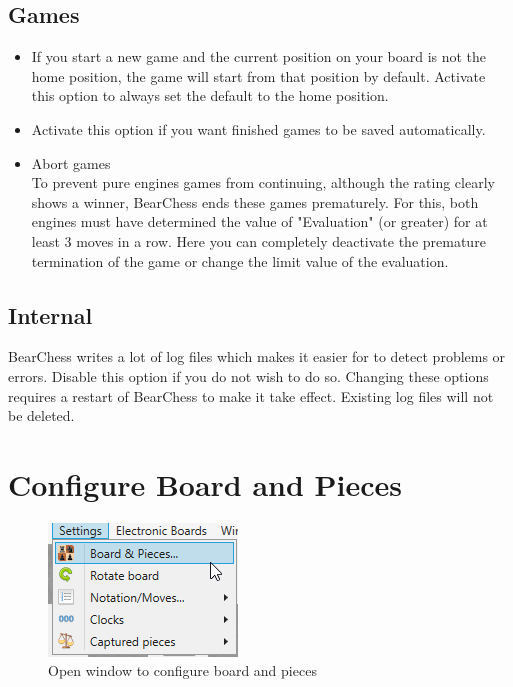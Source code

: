 \documentclass[11pt,a4paper]{article}
\begin{document}
	\subsection{Games}
	\begin{itemize}
		\item If you start a new game and the current position on your board is not the home position, the game will start from that position by default. Activate this option to always set the default to the home position.
		\item Activate this option if you want finished games to be saved automatically.
		\item Abort games\\To prevent pure engines games from continuing, although the rating clearly shows a winner, BearChess ends these games prematurely. For this, both engines must have determined the value of "Evaluation" (or greater) for at least 3 moves in a row. Here you can completely deactivate the premature termination of the game or change the limit value of the evaluation.
	\end{itemize}
	
	\subsection{Internal}
	BearChess writes a lot of log files which makes it easier for to detect problems or errors.
	Disable this option if you do not wish to do so. Changing these options requires a restart of BearChess to make it take effect. Existing log files will not be deleted.
	
	
	\section{Configure Board and Pieces} \label{BoardAndPieces}
	
	\begin{figure}[H]
		\centering
		\includegraphics[scale=1.0]{SettingsBoardAndPieces.png}
		\caption{Open window to configure board and pieces }
		\label{fig:SettingsBoardAndPieces}
	\end{figure}
	
\end{document}
